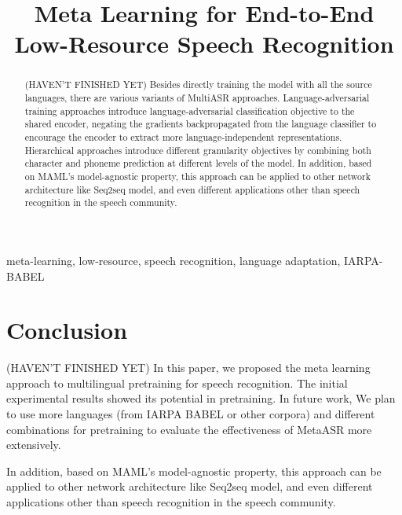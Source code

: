 \documentclass{article}
\title{Meta Learning for End-to-End Low-Resource Speech Recognition}
\begin{document}
%
\maketitle
%
\begin{abstract}
 (HAVEN'T FINISHED YET)  Besides directly training the model with all the source languages, there are various variants of MultiASR approaches. 
Language-adversarial training approaches \cite{Yi2018AdversarialMT, adams2019massively} introduce language-adversarial classification objective to the shared encoder, negating the gradients backpropagated from the language classifier to encourage the encoder to extract more language-independent representations. 
Hierarchical approaches \cite{Sanabria2018HierarchicalMT} introduce different granularity objectives by combining both character and phoneme prediction at different levels of the model.
In addition, based on MAML's model-agnostic property, this approach can be applied to other network architecture like Seq2seq model, and even different applications other than speech recognition in the speech community.
\end{abstract}
%
\begin{keywords}
  meta-learning, low-resource, speech recognition, language adaptation, IARPA-BABEL
\end{keywords}
%




%

\section{Conclusion}
\label{sec:conclusion}
(HAVEN'T FINISHED YET) In this paper, we proposed the meta learning approach to multilingual pretraining for speech recognition. The initial experimental results showed its potential in pretraining. In future work, We plan to use more languages (from IARPA BABEL or other corpora) and different combinations for pretraining to evaluate the effectiveness of MetaASR more extensively. 

In addition, based on MAML's model-agnostic property, this approach can be applied to other network architecture like Seq2seq model, and even different applications other than speech recognition in the speech community.

\end{document}
